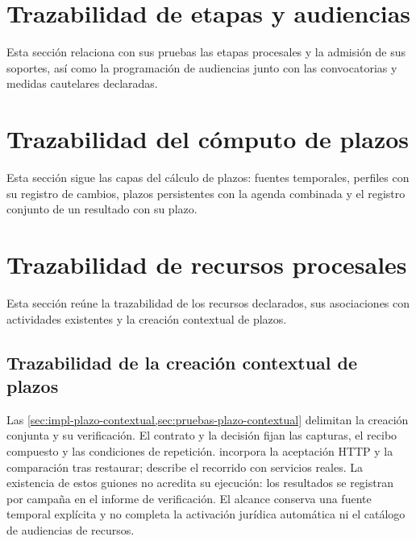 \section{Trazabilidad de etapas y audiencias}\label{sec:matriz-grupo-actuaciones}

Esta sección relaciona con sus pruebas las etapas procesales y la admisión de sus soportes, así como la programación de audiencias junto con las convocatorias y medidas cautelares declaradas.





\section{Trazabilidad del cómputo de plazos}\label{sec:matriz-grupo-plazos}

Esta sección sigue las capas del cálculo de plazos: fuentes temporales, perfiles con su registro de cambios, plazos persistentes con la agenda combinada y el registro conjunto de un resultado con su plazo.









\section{Trazabilidad de recursos procesales}\label{sec:matriz-grupo-recursos}

Esta sección reúne la trazabilidad de los recursos declarados, sus asociaciones con actividades existentes y la creación contextual de plazos.





\subsection{Trazabilidad de la creación contextual de plazos}\label{anexo:plazo-contextual}

Las \cref{sec:impl-plazo-contextual,sec:pruebas-plazo-contextual} delimitan la creación conjunta y su verificación. El contrato  y la decisión  fijan las capturas, el recibo compuesto y las condiciones de repetición.  incorpora la aceptación HTTP y la comparación tras restaurar;  describe el recorrido con servicios reales. La existencia de estos guiones no acredita su ejecución: los resultados se registran por campaña en el informe de verificación. El alcance conserva una fuente temporal explícita y no completa la activación jurídica automática ni el catálogo de audiencias de recursos.

